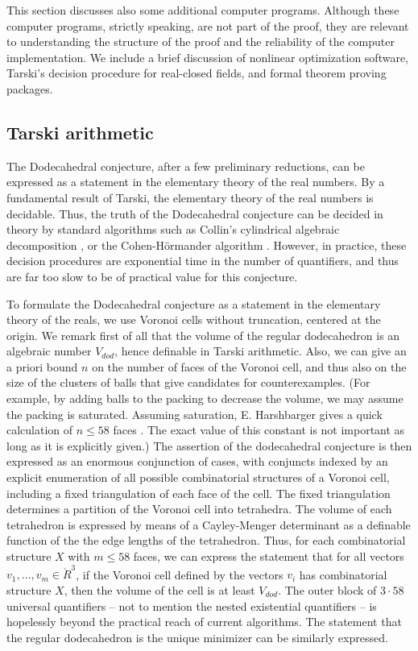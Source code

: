 This section discusses  also some
additional computer programs.  Although these computer programs,
strictly speaking, are not part of the proof, they are relevant
to understanding the structure of the proof and the reliability of
the computer implementation.   We include a brief discussion of
nonlinear optimization software, Tarski's decision procedure for
real-closed fields, and formal theorem proving packages.

\subsection{Tarski arithmetic}


The Dodecahedral conjecture, after a few preliminary reductions, 
can be expressed as a statement
in the elementary theory of the real numbers.  By a fundamental
result of Tarski, the elementary theory of the real numbers
is decidable.  Thus, the
truth of the Dodecahedral 
conjecture can be decided in theory by standard
algorithms such as Collin's cylindrical algebraic decomposition \cite{ColXX}, or the Cohen-H\"ormander algorithm \cite{CHX}.  However,
in practice, these decision procedures are exponential time in the
number of quantifiers, and thus are far too slow to be of practical
value for this conjecture.

To formulate the Dodecahedral conjecture as a statement in the
elementary theory of the reals, we use Voronoi cells without
truncation, centered at the origin.  We remark first of all that the
volume of the regular dodecahedron is an algebraic number $V_{dod}$,
hence definable in Tarski arithmetic.  Also, we can give an
a priori bound $n$ on the number of faces of the Voronoi cell, and thus also
on the size of the clusters of balls that give candidates for counterexamples. (For example, by adding balls to the packing to decrease the volume, we may assume the packing is saturated.  Assuming saturation, E. Harshbarger gives a quick calculation of $n\le58$ faces \cite{Har}. The exact value of this constant is not important as long as it is explicitly given.)
The assertion of the dodecahedral conjecture is then expressed as an enormous conjunction
of cases, with conjuncts indexed by an explicit enumeration of all possible combinatorial structures of a Voronoi cell, including a fixed triangulation of each face of the cell.  The fixed triangulation determines
a partition of the Voronoi cell into tetrahedra.  The volume of each tetrahedron is expressed by means of a Cayley-Menger determinant as a definable function of the the edge lengths of the tetrahedron.  Thus, for each combinatorial structure $X$ with $m\le 58$ faces, we can express the statement that
for all vectors $v_1,\ldots,v_m\in\ring{R}^3$, if the Voronoi cell defined by the vectors $v_i$ has combinatorial structure $X$, then the volume of the cell is at least $V_{dod}$.  The outer block of $3\cdot 58$ universal quantifiers -- not to mention the nested existential quantifiers -- is hopelessly beyond the practical reach of current algorithms.  The statement that the regular dodecahedron is the unique minimizer can be similarly expressed.

